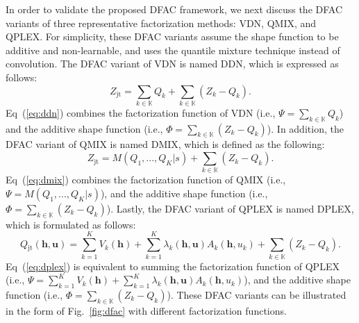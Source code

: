 \documentclass[twoside,11pt]{article}
\newcommand{\state}{s}
\newcommand{\jointaction}{\mathbf{u}}
\newcommand{\action}{u}
\newcommand{\jointobservationhistory}{\mathbf{h}}
\newcommand{\agentspace}{\mathbb{K}}
\newcommand{\agentcounter}{k}
\newcommand{\numberofagents}{K}
\newcommand{\utilityexp}{Q}
\newcommand{\utilityadv}{A}
\newcommand{\utilitystate}{V}
\newcommand{\utility}{Z}
\newcommand{\joint}{\mathrm{jt}}
\newcommand{\monotonicfunction}{M}
\newcommand{\meandecompositionfunction}{\Psi}
\newcommand{\shapedecompositionfunction}{\Phi}
\newcommand{\ddn}{DDN}
\begin{document}
In order to validate the proposed DFAC framework, we next discuss the DFAC variants of three representative factorization methods: VDN, QMIX, and QPLEX.
For simplicity, these DFAC variants assume the shape function to be additive and non-learnable, and uses the quantile mixture technique instead of convolution.
The DFAC variant of VDN is named \ddn{}, which is expressed as follows:
\begin{equation}
\utility_\joint=\sum_{\agentcounter\in\agentspace{}}\utilityexp_{\agentcounter}+\sum_{\agentcounter\in\agentspace{}}(\utility_{\agentcounter}-\utilityexp_{\agentcounter}).
\label{eq:ddn}
\end{equation}
Eq~(\ref{eq:ddn}) combines the factorization function of VDN (i.e., $\meandecompositionfunction=\sum_{\agentcounter\in\agentspace{}}\utilityexp_{\agentcounter}$) and the additive shape function (i.e.,  $\shapedecompositionfunction=\sum_{\agentcounter\in\agentspace{}}(\utility_{\agentcounter}-\utilityexp_{\agentcounter})$).
In addition, the DFAC variant of QMIX is named DMIX, which is defined as the following:
\begin{equation}
\utility_\joint=\monotonicfunction{}(\utilityexp_1,...,\utilityexp_\numberofagents\vert\state)+\sum_{\agentcounter\in\agentspace{}}(\utility_{\agentcounter}-\utilityexp_{\agentcounter}).
\label{eq:dmix}
\end{equation}
Eq~(\ref{eq:dmix}) combines the factorization function of QMIX (i.e., $\meandecompositionfunction=\monotonicfunction{}(\utilityexp_1,...,\utilityexp_\numberofagents\vert\state)$), and the additive shape function (i.e., $\shapedecompositionfunction=\sum_{\agentcounter\in\agentspace{}}(\utility_{\agentcounter}-\utilityexp_{\agentcounter})$). Lastly, the DFAC variant of QPLEX is named DPLEX, which is formulated as follows:
\begin{equation}
\utilityexp{}_{\joint{}}(\jointobservationhistory{},\jointaction{}) = \sum^{\numberofagents{}}_{\agentcounter{}=1} \utilitystate_\agentcounter{}(\jointobservationhistory{}) + \sum^{\numberofagents{}}_{\agentcounter{}=1}\lambda_\agentcounter{}(\jointobservationhistory{},\jointaction{}) \utilityadv_\agentcounter{}(\jointobservationhistory{},\action{}_\agentcounter{})+\sum_{\agentcounter\in\agentspace{}}(\utility_{\agentcounter}-\utilityexp_{\agentcounter}).
\label{eq:dplex}
\end{equation}
Eq~(\ref{eq:dplex})  is equivalent to summing the factorization function of QPLEX (i.e., $\meandecompositionfunction=\sum^{\numberofagents{}}_{\agentcounter{}=1} \utilitystate_\agentcounter{}(\jointobservationhistory{}) + \sum^{\numberofagents{}}_{\agentcounter{}=1}\lambda_\agentcounter{}(\jointobservationhistory{},\jointaction{}) \utilityadv_\agentcounter{}(\jointobservationhistory{},\action{}_\agentcounter{})$), and the additive shape function (i.e., $\shapedecompositionfunction=\sum_{\agentcounter\in\agentspace{}}(\utility_{\agentcounter}-\utilityexp_{\agentcounter})$).
These DFAC variants can be illustrated in the form of Fig.~\ref{fig:dfac} with different factorization functions.
\end{document}
